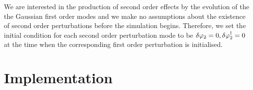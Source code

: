 We are interested in the production of second order effects by the
evolution of the the Gaussian first order modes and we make no
assumptions about the existence of second order perturbations before
the simulation begins. Therefore, we set the initial condition for each second order
perturbation mode to be $\delta\varphi_{2}=0, \delta\varphi_{2}^{\dagger}=0$ at
the time when the corresponding first order perturbation is initialised.



\section{Implementation} 
\label{sec:impl-num}


